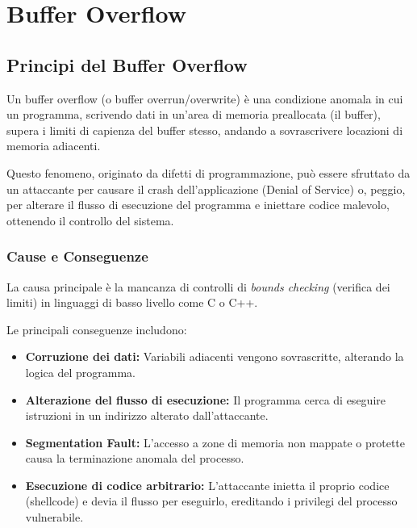 \chapter{Buffer Overflow}

\section{Principi del Buffer Overflow}

\begin{defbox}
Un buffer overflow (o buffer overrun/overwrite) è una condizione anomala in cui un programma, scrivendo dati in un'area di memoria preallocata (il buffer), supera i limiti di capienza del buffer stesso, andando a sovrascrivere locazioni di memoria adiacenti.
\end{defbox}

Questo fenomeno, originato da difetti di programmazione, può essere sfruttato da un attaccante per causare il crash dell'applicazione (Denial of Service) o, peggio, per alterare il flusso di esecuzione del programma e iniettare codice malevolo, ottenendo il controllo del sistema.

\subsection{Cause e Conseguenze}
La causa principale è la mancanza di controlli di \textit{bounds checking} (verifica dei limiti) in linguaggi di basso livello come C o C++.

Le principali conseguenze includono:
\begin{itemize}
    \item \textbf{Corruzione dei dati:} Variabili adiacenti vengono sovrascritte, alterando la logica del programma.
    \item \textbf{Alterazione del flusso di esecuzione:} Il programma cerca di eseguire istruzioni in un indirizzo alterato dall'attaccante.
    \item \textbf{Segmentation Fault:} L'accesso a zone di memoria non mappate o protette causa la terminazione anomala del processo.
    \item \textbf{Esecuzione di codice arbitrario:} L'attaccante inietta il proprio codice (shellcode) e devia il flusso per eseguirlo, ereditando i privilegi del processo vulnerabile.
\end{itemize}

